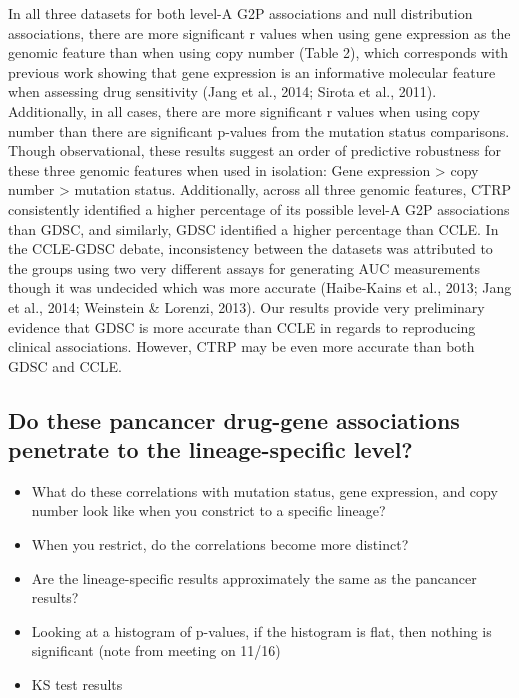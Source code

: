 \documentclass[man,floatsintext]{apa6}
\providecommand{\tightlist}{%
  \setlength{\itemsep}{0pt}\setlength{\parskip}{0pt}}
\begin{document}
In all three datasets for both level-A G2P associations and null
distribution associations, there are more significant
\textbar{}r\textbar{} values when using gene expression as the genomic
feature than when using copy number (Table 2), which corresponds with
previous work showing that gene expression is an informative molecular
feature when assessing drug sensitivity (Jang et al., 2014; Sirota et
al., 2011). Additionally, in all cases, there are more significant r
values when using copy number than there are significant p-values from
the mutation status comparisons. Though observational, these results
suggest an order of predictive robustness for these three genomic
features when used in isolation: Gene expression \textgreater{} copy
number \textgreater{} mutation status. Additionally, across all three
genomic features, CTRP consistently identified a higher percentage of
its possible level-A G2P associations than GDSC, and similarly, GDSC
identified a higher percentage than CCLE. In the CCLE-GDSC debate,
inconsistency between the datasets was attributed to the groups using
two very different assays for generating AUC measurements though it was
undecided which was more accurate (Haibe-Kains et al., 2013; Jang et
al., 2014; Weinstein \& Lorenzi, 2013). Our results provide very
preliminary evidence that GDSC is more accurate than CCLE in regards to
reproducing clinical associations. However, CTRP may be even more
accurate than both GDSC and CCLE.

\subsection{Do these pancancer drug-gene associations penetrate to the
lineage-specific
level?}\label{do-these-pancancer-drug-gene-associations-penetrate-to-the-lineage-specific-level}

\begin{itemize}
\tightlist
\item
  What do these correlations with mutation status, gene expression, and
  copy number look like when you constrict to a specific lineage?
\item
  When you restrict, do the correlations become more distinct?
\item
  Are the lineage-specific results approximately the same as the
  pancancer results?
\item
  Looking at a histogram of p-values, if the histogram is flat, then
  nothing is significant (note from meeting on 11/16)
\item
  KS test results
\end{itemize}
\end{document}
